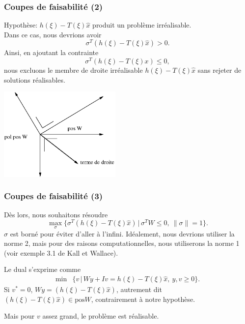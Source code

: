 \begin{frame}
	\frametitle{Coupes de faisabilité (2)}
	
	{\red Hypothèse:} $h(\xi) - T(\xi)\hat{x}$ produit un problème
	irréalisable.\\
	Dans ce cas, nous devrions avoir
	\[
	\sigma^T(h(\xi) - T(\xi)\hat{x}) > 0.
	\]
	Ainsi, en ajoutant la contrainte
	\[
	\sigma^T(h(\xi) - T(\xi) x) \leq 0,
	\]
	nous excluons le membre de droite irréalisable $h(\xi) -
	T(\xi)\hat{x}$ sans rejeter de solutions réalisables.
	
	\begin{center}
		\includegraphics[width=0.45\textwidth]{cones_2.eps}
	\end{center}
	
\end{frame}

\begin{frame}
	\frametitle{Coupes de faisabilité (3)}
	
	Dès lors, nous souhaitons résoudre
	\[
	\max_{\sigma} \lbrace \sigma^T(h(\xi) - T(\xi)\hat{x}) \,|\, \sigma^TW
	\leq 0,\ \|\sigma\| = 1 \rbrace.
	\]
	$\sigma$ est borné pour éviter d'aller à l'infini. Idéalement,
	nous devrions utiliser la norme 2, mais pour des raisons
	computationnelles, nous utiliserons la norme 1 (voir exemple 3.1 de
	Kall et Wallace).
	
	\mbox{}
	
	
	Le dual s'exprime comme
	\begin{align*}
	\min & \lbrace v \,|\, Wy + Iv = h(\xi) - T(\xi)\hat{x},\ y, v \geq 0 \rbrace.
	\end{align*}
	Si $v^* = 0$, $Wy = (h(\xi) - T(\xi)\hat{x})$, autrement dit $(h(\xi) -
	T(\xi)\hat{x}) \in \mbox{pos}W$, contrairement à notre hypothèse.
	
	Mais pour $v$ assez grand, le problème est réalisable.
	
\end{frame}

